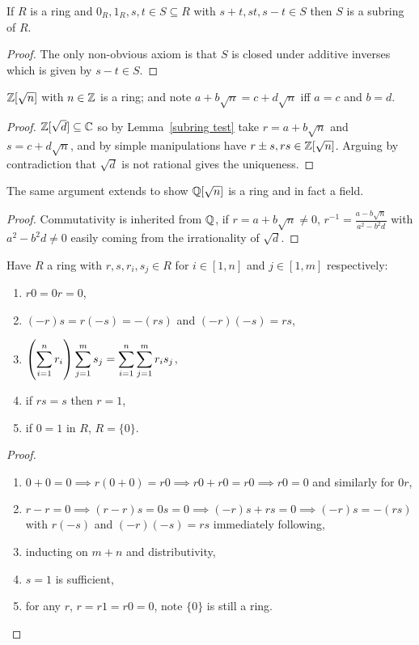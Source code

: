 \documentclass{report}
\begin{document}
\begin{lemma}\label{subring test}
    If $R$ is a ring and $0_R,1_R,s,t\in S\subseteq R$ with $s+t,st,s-t\in S$ then $S$ is a subring of $R$.
    \begin{proof}
        The only non-obvious axiom is that $S$ is closed under additive inverses which is given by $s-t\in S$.
    \end{proof}
\end{lemma}

\begin{example}
    $\mathbb{Z}[\sqrt{n}]$ with $n\in\mathbb{Z}$ is a ring; and note $a+b\sqrt{n}=c+d\sqrt{n}$ iff $a=c$ and $b=d$. \begin{proof}
        $\mathbb{Z}[\sqrt{d}]\subseteq\mathbb{C}$ so by Lemma~\ref{subring test} take $r=a+b\sqrt{n}$ and $s=c+d\sqrt{n}$, and by simple manipulations have $r\pm s, rs\in \mathbb{Z}[\sqrt{n}]$. Arguing by contradiction that $\sqrt{d}$ is not rational gives the uniqueness.
    \end{proof}
\end{example}

\begin{corollary}
    The same argument extends to show $\mathbb{Q}[\sqrt{n}]$ is a ring and in fact a field.\begin{proof}
        Commutativity is inherited from $\mathbb{Q}$, if $r=a+b\sqrt{n}\neq 0$, $\displaystyle r^{-1}=\frac{a-b\sqrt{n}}{a^2-b^2d}$ with $a^2-b^2d\neq0$ easily coming from the irrationality of $\sqrt{d}$.
    \end{proof}
\end{corollary}

\begin{propositions}
    Have $R$ a ring with $r,s,r_i,s_j\in R$ for $i\in[1,n]$ and $j\in[1,m]$ respectively:\begin{enumerate}
        \item $r0=0r=0$,
        \item $(-r)s=r(-s)=-(rs)$ and $(-r)(-s)=rs$,
        \item $\displaystyle \br{\sum_{i=1}^nr_i}\sum_{j=1}^ms_j=\sum_{i=1}^n\sum_{j=1}^mr_is_j$,
        \item if $rs=s$ then $r=1$,
        \item if $0=1$ in $R$, $R=\{0\}$.
    \end{enumerate}
    \begin{proof}
        \begin{enumerate}
            \item $0+0=0\implies r(0+0)=r0\implies r0+r0=r0\implies r0=0$ and similarly for $0r$,
            \item $r-r=0\implies (r-r)s=0s=0 \implies (-r)s + rs = 0 \implies (-r)s=-(rs)$ with $r(-s)$ and $(-r)(-s) = rs$ immediately following,
            \item inducting on $m+n$ and distributivity,
            \item $s=1$ is sufficient,
            \item for any $r$, $r=r1=r0=0$, note $\{0\}$ is still a ring.\vspace{-12pt}
        \end{enumerate}
    \end{proof}
\end{propositions}
\end{document}
